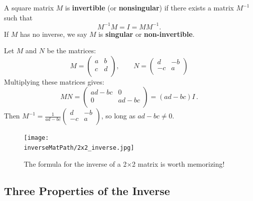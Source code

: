 \begin{definition}
A square matrix $M$ is {\bf invertible} (or {\bf nonsingular}) if there exists a matrix $M^{-1}$ such that
\[
M^{-1}M=I=MM^{-1}.
\]
If $M$ has no inverse, we say $M$ is {\bf singular} or {\bf non-invertible}.
\end{definition}



\begin{remark} Let $M$ and $N$ be the matrices:
\[
M=\begin{pmatrix}
a & b \\
c & d \\
\end{pmatrix},\qquad N=\begin{pmatrix}
d & -b \\
-c & a \\
\end{pmatrix}
\]
Multiplying these matrices gives:
\[
MN=\begin{pmatrix}
ad-bc & 0 \\
0 & ad-bc \\
\end{pmatrix}=(ad-bc)I\, .
\]
Then $M^{-1}=\frac{1}{ad-bc}\begin{pmatrix}
d & -b \\
-c & a \\
\end{pmatrix}$, so long as $ad-bc\neq 0$.    
\end{remark}

\begin{figure}
\begin{center}
\texttt{[image: \\inverseMatPath/2x2\_inverse.jpg]}
\end{center}
\caption{The formula for the inverse of a 2$\times$2 matrix is worth memorizing!}
\end{figure}



\subsection{Three Properties of the Inverse}

